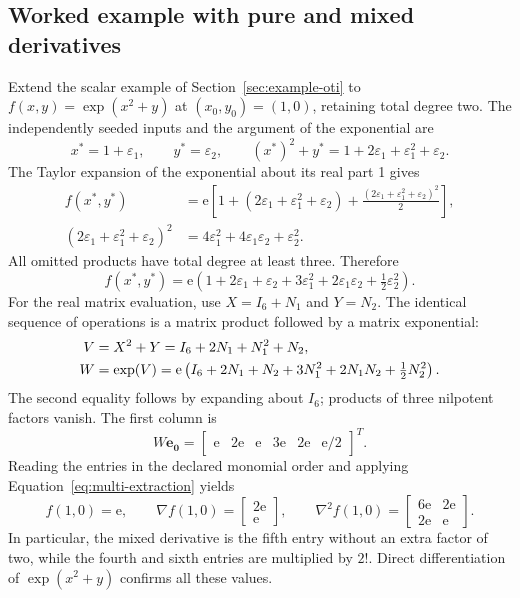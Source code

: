 \subsection{Worked example with pure and mixed derivatives}
\label{sec:multi-example}
Extend the scalar example of Section~\ref{sec:example-oti} to
$f(x,y)=\exp(x^2+y)$ at $(x_0,y_0)=(1,0)$, retaining total degree two.
The independently seeded inputs and the argument of the exponential are
\[
 x^*=1+\varepsilon_1,\qquad y^*=\varepsilon_2,\qquad
 (x^*)^2+y^*=1+2\varepsilon_1+\varepsilon_1^2+\varepsilon_2.
\]
The Taylor expansion of the exponential about its real part 1 gives
\begin{align*}
 f(x^*,y^*)&=\mathrm e\left[1+(2\varepsilon_1+\varepsilon_1^2+\varepsilon_2)
 +\frac{(2\varepsilon_1+\varepsilon_1^2+\varepsilon_2)^2}{2}\right],\\
 (2\varepsilon_1+\varepsilon_1^2+\varepsilon_2)^2
 &=4\varepsilon_1^2+4\varepsilon_1\varepsilon_2+\varepsilon_2^2.
\end{align*}
All omitted products have total degree at least three. Therefore
\begin{equation}
\label{eq:multi-example-oti}
 f(x^*,y^*)=\mathrm e\left(1+2\varepsilon_1+\varepsilon_2+
 3\varepsilon_1^2+2\varepsilon_1\varepsilon_2+
 \tfrac12\varepsilon_2^2\right).
\end{equation}
For the real matrix evaluation, use $X=I_6+N_1$ and $Y=N_2$. The identical
sequence of operations is a matrix product followed by a matrix exponential:
\begin{align}
 V&=X^2+Y=I_6+2N_1+N_1^2+N_2,\notag\\
 W&=\exp(V)=\mathrm e\left(I_6+2N_1+N_2+3N_1^2+
 2N_1N_2+\tfrac12N_2^2\right).
 \label{eq:multi-example-matrix}
\end{align}
The second equality follows by expanding about $I_6$; products of three
nilpotent factors vanish. The first column is
\[
 W\boldsymbol e_{\boldsymbol0}
 =\begin{bmatrix}\mathrm e&2\mathrm e&\mathrm e&3\mathrm e&2\mathrm e&\mathrm e/2\end{bmatrix}^{T}.
\]
Reading the entries in the declared monomial order and applying
Equation~\eqref{eq:multi-extraction} yields
\begin{equation}
\label{eq:multi-example-derivatives}
 f(1,0)=\mathrm e,\qquad
 \nabla f(1,0)=\begin{bmatrix}2\mathrm e\\\mathrm e\end{bmatrix},\qquad
 \nabla^2 f(1,0)=\begin{bmatrix}6\mathrm e&2\mathrm e\\2\mathrm e&\mathrm e\end{bmatrix}.
\end{equation}
In particular, the mixed derivative is the fifth entry without an extra
factor of two, while the fourth and sixth entries are multiplied by $2!$.
Direct differentiation of $\exp(x^2+y)$ confirms all these values.


